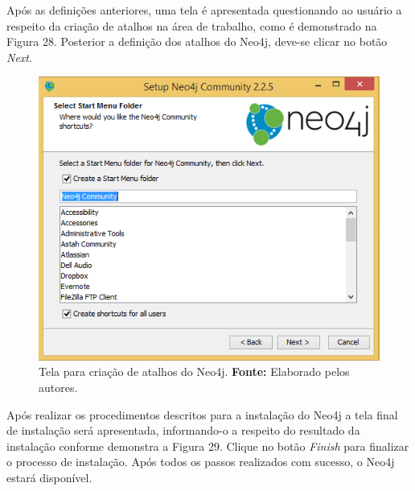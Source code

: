 \par Após as definições anteriores, uma tela é apresentada questionando ao usuário a respeito da criação de atalhos na área de trabalho, como é demonstrado na Figura 28. Posterior a definição dos atalhos do Neo4j, deve-se clicar no botão \textit{Next}.

\begin{figure}[h!]
	\centerline{\includegraphics[scale=0.4]{./imagens/neo4j-install-step4.png}}
	\caption[Tela para criação de atalhos do Neo4j]
	{Tela para criação de atalhos do Neo4j. \textbf{Fonte:} Elaborado pelos autores.}
	\label{fig:exemplo1}
\end{figure}

\par Após realizar os procedimentos descritos para a instalação do Neo4j a tela final de instalação será apresentada, informando-o a respeito do resultado da instalação conforme demonstra a Figura 29. Clique no botão \textit{Finish} para finalizar o processo de instalação.
Após todos os passos realizados com sucesso, o Neo4j estará disponível.


